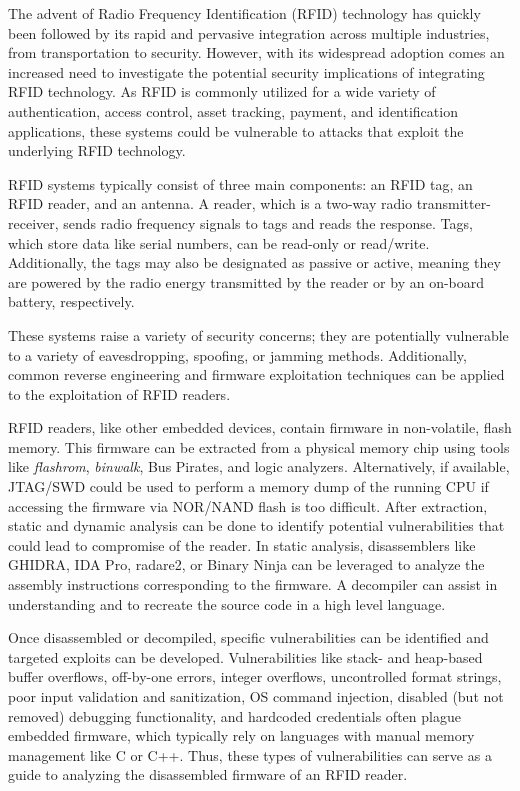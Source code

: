 
The advent of Radio Frequency Identification (RFID) technology has quickly been followed by its rapid and pervasive integration across multiple industries, from transportation to security. However, with its widespread adoption comes an increased need to investigate the potential security implications of integrating RFID technology. As RFID is commonly utilized for a wide variety of authentication, access control, asset tracking, payment, and identification applications, these systems could be vulnerable to attacks that exploit the underlying RFID technology. 

RFID systems typically consist of three main components: an RFID tag, an RFID reader, and an antenna. A reader, which is a two-way radio transmitter-receiver, sends radio frequency signals to tags and reads the response. Tags, which store data like serial numbers, can be read-only or read/write. Additionally, the tags may also be designated as passive or active, meaning they are powered by the radio energy transmitted by the reader or by an on-board battery, respectively.

These systems raise a variety of security concerns; they are potentially vulnerable to a variety of eavesdropping, spoofing, or jamming methods. Additionally, common reverse engineering and firmware exploitation techniques can be applied to the exploitation of RFID readers. 

RFID readers, like other embedded devices, contain firmware in non-volatile, flash memory. This firmware can be extracted from a physical memory chip using tools like \textit{flashrom}, \textit{binwalk}, Bus Pirates, and logic analyzers. Alternatively, if available, JTAG/SWD could be used to perform a memory dump of the running CPU if accessing the firmware via NOR/NAND flash is too difficult. After extraction, static and dynamic analysis can be done to identify potential vulnerabilities that could lead to compromise of the reader. In static analysis, disassemblers like GHIDRA, IDA Pro, radare2, or Binary Ninja can be leveraged to analyze the assembly instructions corresponding to the firmware. A decompiler can assist in understanding and to recreate the source code in a high level language.

Once disassembled or decompiled, specific vulnerabilities can be identified and targeted exploits can be developed. Vulnerabilities like stack- and heap-based buffer overflows, off-by-one errors, integer overflows, uncontrolled format strings, poor input validation and sanitization, OS command injection, disabled (but not removed) debugging functionality, and hardcoded credentials often plague embedded firmware, which typically rely on languages with manual memory management like C or C++. Thus, these types of vulnerabilities can serve as a guide to analyzing the disassembled firmware of an RFID reader. 

